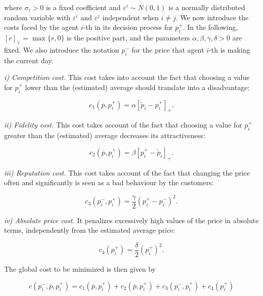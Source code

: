 \documentclass[graybox]{svmult}
\begin{document}
\noindent
where $\sigma_i>0$ is a fixed coefficient and $\varepsilon^i\sim N(0,1)$ is a normally distributed random variable with $\varepsilon^i$ and $\varepsilon^j$ independent when $i\neq j$. We now introduce the costs faced by the agent $i$-th in its decision process for $p_i^+$. In the following,$[r]_+=\max\{r,0\}$ is the positive part, and the parameters $\alpha,\beta,\gamma,\delta>0$ are fixed. We also introduce the notation $p_i^-$ for the price that agent $i$-th is making the current day.

{\it i) Competition cost.} This cost takes into account the fact that choosing a value for $p_i^+$ lower than the (estimated) average should translate into a disadvantage:

\begin{equation}
\label{eq:competition}
c_1(\overline p,p_i^+)=\alpha[\tilde p_i-p_i^+]_+.
\end{equation}

{\it ii) Fidelity cost.} This cost takes account of the fact that choosing a value for $p_i^+$ greater than the (estimated) average decreases its attractiveness: %

\begin{equation}
\label{eq:fidelity}
c_2(\overline p,p_i^+)=\beta[p_i^+-\tilde p_i]_+.
\end{equation}

{\it iii) Reputation cost.} This cost takes account of the fact that changing the price often and significantly is seen as a bad behaviour by the customers:

\begin{equation}
\label{eq:reputation}
c_3(p_i^-,p_i^+)=\frac{\gamma}{2}(p_i^+-p_i^-)^2.
\end{equation}

{\it iv) Absolute price cost.} It penalizes excessively high values of the price in absolute terms, independently from the estimated average price:

\begin{equation}
\label{eq:absoluteprice}
c_4(p_i^+)=\frac{\delta}{2}(p_i^+)^2.
\end{equation}

The global cost to be minimized is then given by

\begin{equation}
\label{eq:cost}
c(p_i^-,\overline p,p_i^+)=c_1(\overline p,p_i^+)+c_2(\overline p,p_i^+)+c_3(p_i^-,p_i^+)+c_4(p_i^+)
\end{equation}
\end{document}
